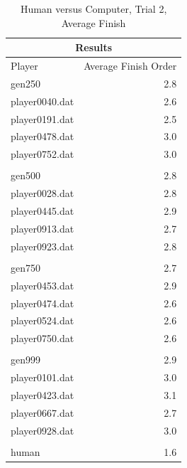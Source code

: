 \begin{table}[htbp]
  \centering
  \caption{Human versus Computer, Trial 2, Average Finish}
    \begin{tabular}{lr}
    \toprule
    \multicolumn{2}{c}{Results} \\
    \midrule
    Player & Average Finish Order \\
    \midrule
    \multicolumn{1}{l}{gen250} & 2.8 \\
    \multicolumn{1}{l}{player0040.dat} & 2.6 \\
    \multicolumn{1}{l}{player0191.dat} & 2.5 \\
    \multicolumn{1}{l}{player0478.dat} & 3.0 \\
    \multicolumn{1}{l}{player0752.dat} & 3.0 \\ \\
    \multicolumn{1}{l}{gen500} & 2.8 \\
    \multicolumn{1}{l}{player0028.dat} & 2.8 \\
    \multicolumn{1}{l}{player0445.dat} & 2.9 \\
    \multicolumn{1}{l}{player0913.dat} & 2.7 \\
    \multicolumn{1}{l}{player0923.dat} & 2.8 \\ \\
    \multicolumn{1}{l}{gen750} & 2.7 \\
    \multicolumn{1}{l}{player0453.dat} & 2.9 \\
    \multicolumn{1}{l}{player0474.dat} & 2.6 \\
    \multicolumn{1}{l}{player0524.dat} & 2.6 \\
    \multicolumn{1}{l}{player0750.dat} & 2.6 \\ \\
    \multicolumn{1}{l}{gen999} & 2.9 \\
    \multicolumn{1}{l}{player0101.dat} & 3.0 \\
    \multicolumn{1}{l}{player0423.dat} & 3.1 \\
    \multicolumn{1}{l}{player0667.dat} & 2.7 \\
    \multicolumn{1}{l}{player0928.dat} & 3.0 \\ \\
    \multicolumn{1}{l}{human} & 1.6 \\
    \bottomrule
    \end{tabular}%
  \label{tab:human_rga_2b}%
\end{table}%

